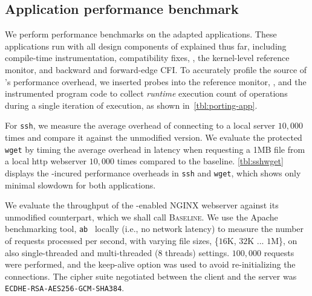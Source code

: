 \subsection{Application performance benchmark} \label{sec:evaluation:macrobench}
We perform performance benchmarks on the adapted applications.
These applications run with all design components of \thename explained thus far, including compile-time instrumentation, compatibility fixes, \libcapac, the kernel-level reference monitor, and backward and forward-edge CFI.
To accurately profile the source of \thename's performance overhead, we inserted probes into the reference monitor, \libcapac, and the instrumented program code to collect \emph{runtime} execution count of \thename operations during a single iteration of execution, as shown in~\autoref{tbl:porting-app}.



For \texttt{ssh}, we measure the average overhead of connecting to a local server $10,000$ times and compare it against the unmodified version.
We evaluate the protected \texttt{wget} by timing the average overhead in latency when requesting a 1MB file from a local http webserver $10,000$ times compared to the baseline.
\autoref{tbl:sshwget} displays the \thename-incured performance overheads in \texttt{ssh} and \texttt{wget}, which shows only minimal slowdown for both applications.
\begin{table}[t]

	\centering
	\footnotesize
	\setlength\tabcolsep{2pt}
	
\end{table}



 We evaluate the throughput of the \thename-enabled NGINX webserver against its unmodified counterpart, which we shall call \textsc{Baseline}.
We use the Apache benchmarking tool, \texttt{ab}~\cite{apache-benchmark} locally (i.e., no network latency) to measure the number of requests processed per second, with varying file sizes, \{$16$K, $32$K ... $1$M\}, on also single-threaded and multi-threaded (8 threads) settings.
$100,000$ requests were performed, and the keep-alive option was used to avoid re-initializing the connections.
The cipher suite negotiated between the client and the server was \texttt{ECDHE-RSA-AES256-GCM-SHA384}.


